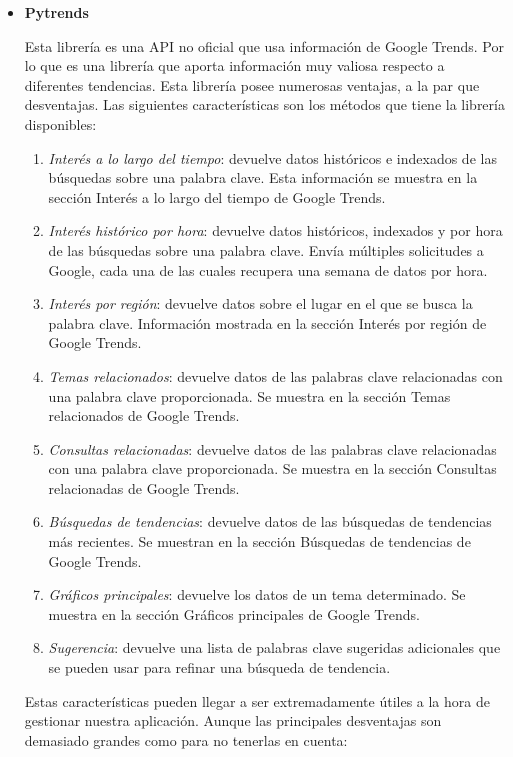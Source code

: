 \begin{itemize}
    \item
    \textbf{Pytrends} \cite{pytrends-manual}
    
    Esta librería es una API no oficial que usa información de Google Trends. Por lo que es una librería que aporta información muy valiosa respecto a diferentes tendencias. Esta librería posee numerosas ventajas, a la par que desventajas. Las siguientes características son los métodos que tiene la librería disponibles:
    \begin{enumerate}
    \item \textit{Interés a lo largo del tiempo}: devuelve datos históricos e indexados de las búsquedas sobre una palabra clave. Esta información se muestra en la sección Interés a lo largo del tiempo de Google Trends.
    \item \textit{Interés histórico por hora}: devuelve datos históricos, indexados y por hora de las búsquedas sobre una palabra clave. Envía múltiples solicitudes a Google, cada una de las cuales recupera una semana de datos por hora.
    \item \textit{Interés por región}: devuelve datos sobre el lugar en el que se busca la palabra clave. Información mostrada en la sección Interés por región de Google Trends.
    \item \textit{Temas relacionados}: devuelve datos de las palabras clave relacionadas con una palabra clave proporcionada. Se muestra en la sección Temas relacionados de Google Trends.
    \item \textit{Consultas relacionadas}: devuelve datos de las palabras clave relacionadas con una palabra clave proporcionada. Se muestra en la sección Consultas relacionadas de Google Trends.
    \item \textit{Búsquedas de tendencias}: devuelve datos de las búsquedas de tendencias más recientes. Se muestran en la sección Búsquedas de tendencias de Google Trends.
    \item \textit{Gráficos principales}: devuelve los datos de un tema determinado. Se muestra en la sección Gráficos principales de Google Trends.
    \item \textit{Sugerencia}: devuelve una lista de palabras clave sugeridas adicionales que se pueden usar para refinar una búsqueda de tendencia.
    \end{enumerate}

    Estas características pueden llegar a ser extremadamente útiles a la hora de gestionar nuestra aplicación. Aunque las principales desventajas son demasiado grandes como para no tenerlas en cuenta:


\end{itemize}
